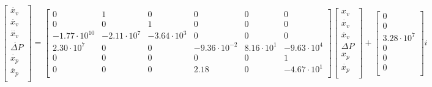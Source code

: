 \begin{scriptsize}
	\begin{center}
		$\begin{bmatrix}
		\dot{x_v} \\
		\ddot{x_v} \\
		\dddot{x_v} \\
		\dot{\Delta P} \\
		\dot{x_p} \\
		\ddot{x_p} \\
		\end{bmatrix} =\begin{bmatrix}
		0 & 1 & 0 & 0 & 0 & 0\\
		0 & 0 & 1 & 0 & 0 & 0\\
		-1.77 \cdot 10^{10} & -2.11 \cdot 10^7 & -3.64 \cdot 10^3 & 0 & 0 & 0\\
		2.30 \cdot 10^7  & 0 & 0 & -9.36 \cdot 10^{-2} & 8.16 \cdot 10^1 & -9.63 \cdot 10^4\\
		0 & 0 & 0 & 0 & 0 & 1\\
		0 & 0 & 0 & 2.18 & 0 & -4.67 \cdot 10^1 \\
		\end{bmatrix}
		\begin{bmatrix}
		x_v \\
		\dot{x_v} \\
		\ddot{x_v} \\
		\Delta P \\
		x_p \\
		\dot{x_p} \\
		\end{bmatrix}
		+
		\begin{bmatrix}
		0 \\
		0 \\
		3.28 \cdot 10^7 \\
		0 \\
		0 \\
		0 \\
		\end{bmatrix}
		i
		$
	\end{center}
\end{scriptsize}
